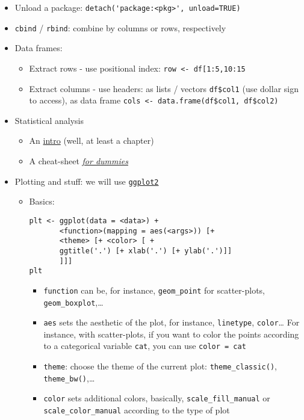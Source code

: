 \documentclass[a4paper,12pt,%
              final%
              ]{article}
\begin{document}
\begin{itemize}
  \item Unload a package: \verb|detach('package:<pkg>', unload=TRUE)|
  \item \verb|cbind| / \verb|rbind|: combine by columns or rows, respectively
  \item Data frames:
    \begin{itemize}
      \item Extract rows - use positional index: \verb|row <- df[1:5,10:15|
      \item Extract columns - use headers: as lists / vectors \verb|df$col1| (use dollar sign to access), as data frame \verb|cols <- data.frame(df$col1, df$col2)|
    \end{itemize}
  \item Statistical analysis
    \begin{itemize}
      \item An \href{https://cran.r-project.org/web/packages/HSAUR/vignettes/Ch_introduction_to_R.pdf}{intro} (well, at least a chapter)
      \item A cheat-sheet \href{https://www.dummies.com/programming/r/statistical-analysis-with-r-for-dummies-cheat-sheet/}{\emph{for dummies}}
    \end{itemize}
  \item Plotting and stuff: we will use \href{https://ggplot2.tidyverse.org/}{\texttt{ggplot2}}
    \begin{itemize}
      \item Basics:
\begin{verbatim}
plt <- ggplot(data = <data>) +
       <function>(mapping = aes(<args>)) [+
       <theme> [+ <color> [ +
       ggtitle('.') [+ xlab('.') [+ ylab('.')]]
       ]]]
plt
\end{verbatim}
        \begin{itemize}
          \item \verb|function| can be, for instance, \verb|geom_point| for scatter-plots, \verb|geom_boxplot|,\ldots
          \item \verb|aes| sets the aesthetic of the plot, for instance, \texttt{linetype}, \texttt{color}\ldots{} For instance, with scatter-plots, if you want to color the points according to a categorical variable \texttt{cat}, you can use \verb|color = cat|
          \item \verb|theme|: choose the theme of the current plot: \verb|theme_classic()|, \verb|theme_bw()|,\ldots
          \item \verb|color| sets additional colors, basically, \verb|scale_fill_manual| or \verb|scale_color_manual| according to the type of plot

\end{itemize}
\end{itemize}
\end{itemize}
\end{document}
